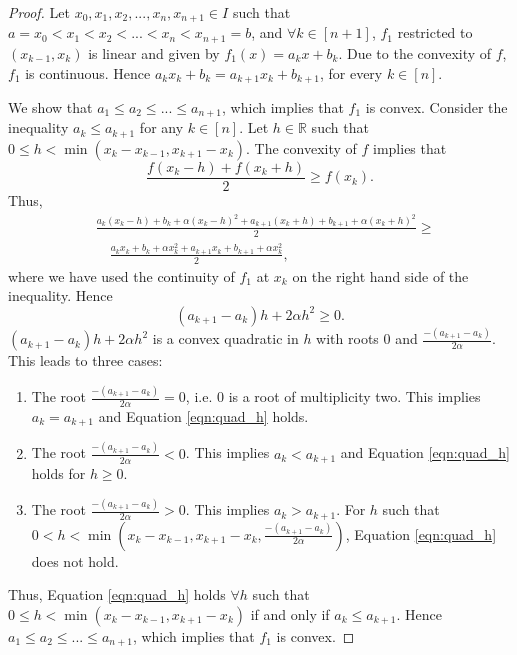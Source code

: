 \documentclass[12pt]{article}
\begin{document}
\begin{proof}
Let $x_0, x_1, x_2, ..., x_n,x_{n+1} \in I$ such that $a=x_0 < x_1 < x_2 < ... < x_n < x_{n+1}=b$, and $\forall k \in [n+1]$, $f_1$ restricted to $(x_{k-1},x_{k})$ is linear and given by $f_1(x) = a_k x + b_k$.  Due to the convexity of $f$, $f_1$ is continuous.  Hence $a_k x_{k} + b_k = a_{k+1} x_{k}  + b_{k+1}$, for every $k \in [n]$.

\noindent We show that $a_1 \leq a_2 \leq ... \leq a_{n+1}$, which implies that $f_1$ is convex.  Consider the inequality $a_k \leq a_{k+1}$ for any $k \in [n]$.  Let $h \in \mathbb{R}$ such that $0 \leq h < \min (x_k-x_{k-1},x_{k+1}-x_k)$. The convexity of $f$ implies that
\[
\frac{f(x_k-h)+f(x_k+h)}{2} \geq f(x_k).
\]
Thus,
\begin{equation*}
    \begin{split}
        & \frac{a_k(x_k-h) + b_k + \alpha(x_k-h)^2 + a_{k+1}(x_k+h) + b_{k+1} + \alpha(x_k +h)^2}{2} \geq \\
        & \quad \frac{a_k x_k+b_k + \alpha x_k^2 + a_{k+1} x_k+b_{k+1} + \alpha x_k^2}{2},
    \end{split}
\end{equation*}
where we have used the continuity of $f_1$ at $x_k$ on the right hand side of the inequality. Hence
\begin{equation}
\label{eqn:quad_h}
(a_{k+1}-a_{k})h + 2 \alpha h^2 \geq 0.   
\end{equation}
$(a_{k+1}-a_{k})h + 2 \alpha h^2$ is a convex quadratic in $h$ with roots $0$ and $\frac{-(a_{k+1}-a_{k})}{2\alpha}$.  This leads to three cases:
\begin{enumerate}
    \item The root $\frac{-(a_{k+1}-a_{k})}{2\alpha} = 0$, i.e. $0$ is a root of multiplicity two.  This implies $a_{k} = a_{k+1}$ and Equation \ref{eqn:quad_h} holds.
    \item The root $\frac{-(a_{k+1}-a_{k})}{2\alpha} < 0$.  This implies $a_{k} < a_{k+1}$ and Equation \ref{eqn:quad_h} holds for $h \geq 0$.  
    \item The root $\frac{-(a_{k+1}-a_{k})}{2\alpha} > 0$. This implies $a_{k} > a_{k+1}$.  For $h$ such that \newline $0 < h < \min(x_{k}-x_{k-1},x_{k+1}-x_{k}, \frac{-(a_{k+1}-a_{k})}{2\alpha})$, Equation \ref{eqn:quad_h} does not hold. 
\end{enumerate}
Thus, Equation \ref{eqn:quad_h} holds $\forall h$ such that $0 \leq h < \min(x_k-x_{k-1},x_{k+1}-x_k)$ if and only if $a_{k} \leq a_{k+1}$.  Hence $a_1 \leq a_2 \leq ... \leq a_{n+1}$, which implies that $f_1$ is convex.
\end{proof}
\end{document}
